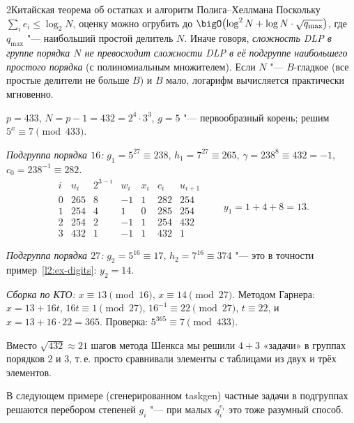\begin{lecture}{2}{Китайская теорема об остатках и алгоритм Полига–Хеллмана}
Поскольку $\sum_i e_i \le \log_2 N$, оценку можно огрубить до
$\bigO\bigl(\log^2 N + \log N \cdot \sqrt{q_{\max}}\bigr)$, где $q_{\max}$ "--- наибольший простой
делитель $N$. Иначе говоря, \emph{сложность DLP в группе порядка $N$ не превосходит сложности DLP
в её подгруппе наибольшего простого порядка} (с полиномиальным множителем). Если $N$ "---
$B$-гладкое (все простые делители не больше $B$) и $B$ мало, логарифм вычисляется практически
мгновенно.

\begin{example}\label{l2:ex-ph}
$p = 433$, $N = p - 1 = 432 = 2^4 \cdot 3^3$, $g = 5$ "--- первообразный корень; решим
$5^x \equiv 7 \pmod{433}$.

\emph{Подгруппа порядка $16$:} $g_1 = 5^{27} \equiv 238$, $h_1 = 7^{27} \equiv 265$,
$\gamma = 238^8 \equiv 432 = -1$, $c_0 = 238^{-1} \equiv 282$.
\[
\begin{array}{c|r|c|r|c|r|r}
  i & u_i & 2^{3-i} & w_i & x_i & c_i & u_{i+1} \\ \hline
  0 & 265 & 8 & -1 & 1 & 282 & 254 \\
  1 & 254 & 4 & 1 & 0 & 285 & 254 \\
  2 & 254 & 2 & -1 & 1 & 254 & 432 \\
  3 & 432 & 1 & -1 & 1 & 432 & 1
\end{array}
\qquad y_1 = 1 + 4 + 8 = 13 .
\]

\emph{Подгруппа порядка $27$:} $g_2 = 5^{16} \equiv 17$, $h_2 = 7^{16} \equiv 374$ "--- это в точности
пример~\ref{l2:ex-digits}: $y_2 = 14$.

\emph{Сборка по КТО:} $x \equiv 13 \pmod{16}$, $x \equiv 14 \pmod{27}$. Методом Гарнера:
$x = 13 + 16t$, $16t \equiv 1 \pmod{27}$, $16^{-1} \equiv 22 \pmod{27}$, $t \equiv 22$, и
$x = 13 + 16 \cdot 22 = 365$. Проверка: $5^{365} \equiv 7 \pmod{433}$.

Вместо $\sqrt{432} \approx 21$ шагов метода Шенкса мы решили $4 + 3$ «задачи» в группах порядков
$2$ и $3$, т.\,е. просто сравнивали элементы с таблицами из двух и трёх элементов.
\end{example}

В следующем примере (сгенерированном taskgen) частные задачи в подгруппах решаются перебором
степеней $g_i$ "--- при малых $q_i^{e_i}$ это тоже разумный способ.




\end{lecture}
